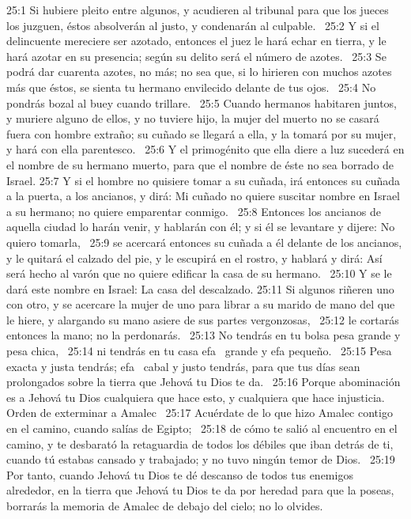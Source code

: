 25:1 Si hubiere pleito entre algunos, y acudieren al tribunal para que los jueces los juzguen, éstos absolverán al justo, y condenarán al culpable.  
25:2 Y si el delincuente mereciere ser azotado, entonces el juez le hará echar en tierra, y le hará azotar en su presencia; según su delito será el número de azotes.  
25:3 Se podrá dar cuarenta azotes, no más; no sea que, si lo hirieren con muchos azotes más que éstos, se sienta tu hermano envilecido delante de tus ojos.  
25:4 No pondrás bozal al buey cuando trillare.  
25:5 Cuando hermanos habitaren juntos, y muriere alguno de ellos, y no tuviere hijo, la mujer del muerto no se casará fuera con hombre extraño; su cuñado se llegará a ella, y la tomará por su mujer, y hará con ella parentesco.  
25:6 Y el primogénito que ella diere a luz sucederá en el nombre de su hermano muerto, para que el nombre de éste no sea borrado de Israel. 
25:7 Y si el hombre no quisiere tomar a su cuñada, irá entonces su cuñada a la puerta, a los ancianos, y dirá: Mi cuñado no quiere suscitar nombre en Israel a su hermano; no quiere emparentar conmigo.  
25:8 Entonces los ancianos de aquella ciudad lo harán venir, y hablarán con él; y si él se levantare y dijere: No quiero tomarla,  
25:9 se acercará entonces su cuñada a él delante de los ancianos, y le quitará el calzado del pie, y le escupirá en el rostro, y hablará y dirá: Así será hecho al varón que no quiere edificar la casa de su hermano.  
25:10 Y se le dará este nombre en Israel: La casa del descalzado. 
25:11 Si algunos riñeren uno con otro, y se acercare la mujer de uno para librar a su marido de mano del que le hiere, y alargando su mano asiere de sus partes vergonzosas,  
25:12 le cortarás entonces la mano; no la perdonarás.  
25:13 No tendrás en tu bolsa pesa grande y pesa chica,  
25:14 ni tendrás en tu casa efa  grande y efa pequeño.  
25:15 Pesa exacta y justa tendrás; efa  cabal y justo tendrás, para que tus días sean prolongados sobre la tierra que Jehová tu Dios te da.  
25:16 Porque abominación es a Jehová tu Dios cualquiera que hace esto, y cualquiera que hace injusticia. 
Orden de exterminar a Amalec  
25:17 Acuérdate de lo que hizo Amalec contigo en el camino, cuando salías de Egipto;  
25:18 de cómo te salió al encuentro en el camino, y te desbarató la retaguardia de todos los débiles que iban detrás de ti, cuando tú estabas cansado y trabajado; y no tuvo ningún temor de Dios.  
25:19 Por tanto, cuando Jehová tu Dios te dé descanso de todos tus enemigos alrededor, en la tierra que Jehová tu Dios te da por heredad para que la poseas, borrarás la memoria de Amalec de debajo del cielo; no lo olvides. 
